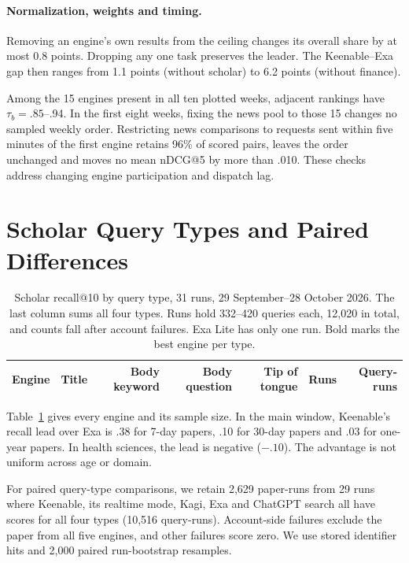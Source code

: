 \documentclass[11pt]{article}
\makeatletter
\newcommand{\ndcg}{nDCG@5\xspace}
\makeatother
\begin{document}
\paragraph{Normalization, weights and timing.}
Removing an engine's own results from the ceiling changes its overall
share by at most 0.8 points. Dropping any one task preserves the leader.
The Keenable--Exa gap then ranges from 1.1 points (without scholar) to
6.2 points (without finance).

Among the 15 engines present in all ten plotted weeks, adjacent
rankings have $\tau_b=.85$--.94. In the first eight weeks, fixing the
news pool to those 15 changes no sampled weekly order. Restricting news comparisons to requests sent
within five minutes of the first engine retains 96\% of scored pairs,
leaves the order unchanged and moves no mean \ndcg by more than .010.
These checks address changing engine participation and dispatch lag.

\section{Scholar Query Types and Paired Differences}
\label{app:scholarpaired}

\begin{table}[t]
\centering\small
\setlength{\tabcolsep}{8pt}
\begin{tabular}{@{}lrrrrrr@{}}
\toprule
Engine & Title & Body keyword & Body question & Tip of tongue & Runs & Query-runs \\
\midrule

\bottomrule
\end{tabular}
\caption{Scholar recall@10 by query type, 31 runs, 29 September--28 October
2026. The last column sums all four types. Runs hold 332--420 queries
each, 12,020 in total, and counts fall after account failures. Exa Lite
has only one run. Bold marks the best engine per type.}
\label{tab:buckets}
\end{table}

Table~\ref{tab:buckets} gives every engine and its sample size. In the
main window, Keenable's recall lead over Exa is .38 for 7-day
papers, .10 for 30-day papers and .03 for one-year papers. In health
sciences, the lead is negative ($-.10$). The advantage is not uniform
across age or domain.

For paired query-type comparisons, we retain 2,629 paper-runs from 29 runs
where Keenable, its realtime mode, Kagi, Exa and ChatGPT search all have
scores for all four types (10,516 query-runs). Account-side failures
exclude the paper from all five engines, and other failures score zero.
We use stored identifier hits and 2,000 paired run-bootstrap resamples.
\end{document}
